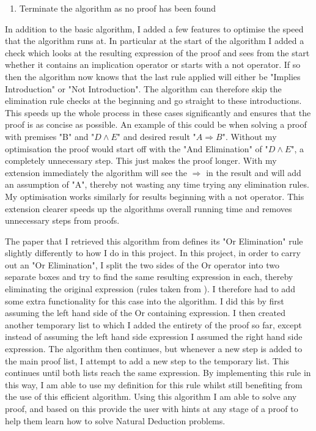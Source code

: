 \begin{algorithm}
{\begin{minipage}{.92\linewidth}
\begin{enumerate}
				\item Terminate the algorithm as no proof has been found
				
			\end{enumerate}
		
		\end{minipage}}

\end{algorithm}


In addition to the basic algorithm, I added a few features to optimise the speed that the algorithm runs at. In particular at the start of the algorithm I added a check which looks at the resulting expression of the proof and sees from the start whether it contains an implication operator or starts with a not operator. If so then the algorithm now knows that the last rule applied will either be "Implies Introduction" or "Not Introduction". The algorithm can therefore skip the elimination rule checks at the beginning and go straight to these introductions. This speeds up the whole process in these cases significantly and ensures that the proof is as concise as possible. An example of this could be when solving a proof with premises "B" and "$D \wedge E$" and desired result "$A \Rightarrow B$". Without my optimisation the proof would start off with the "And Elimination" of "$D \wedge E$", a completely unnecessary step. This just makes the proof longer. With my extension immediately the algorithm will see the $\Rightarrow$ in the result and will add an assumption of "A", thereby not wasting any time trying any elimination rules. My optimisation works similarly for results beginning with a not operator. This extension clearer speeds up the algorithms overall running time and removes unnecessary steps from proofs.

 The paper that I retrieved this algorithm from defines its "Or Elimination" rule slightly differently to how I do in this project. In this project, in order to carry out an "Or Elimination", I split the two sides of the Or operator into two separate boxes and try to find the same resulting expression in each, thereby eliminating the original expression (rules taken from \cite{ndBook}). I therefore had to add some extra functionality for this case into the algorithm. I did this by first assuming the left hand side of the Or containing expression. I then created another temporary list to which I added the entirety of the proof so far, except instead of assuming the left hand side expression I assumed the right hand side expression. The algorithm then continues, but whenever a new step is added to the main proof list, I attempt to add a new step to the temporary list. This continues until both lists reach the same expression. By implementing this rule in this way, I am able to use my definition for this rule whilst still benefiting from the use of this efficient algorithm. Using this algorithm I am able to solve any proof, and based on this provide the user with hints at any stage of a proof to help them learn how to solve Natural Deduction problems. 

